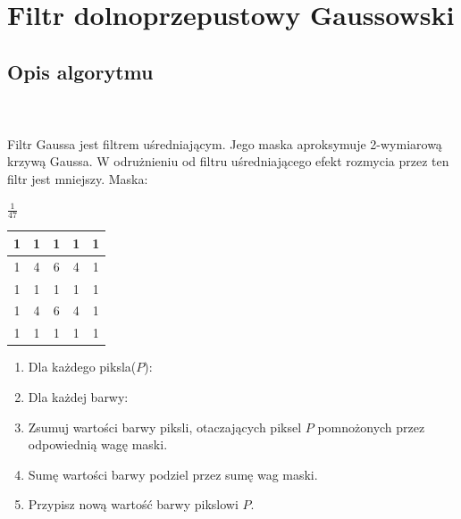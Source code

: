 \documentclass[final,a4paper,openany,12pt]{mwbk}
\begin{document}
\newpage



\section{Filtr dolnoprzepustowy Gaussowski}
\subsection*{Opis algorytmu}
\hfill
\\\\
\indent Filtr Gaussa jest filtrem uśredniającym. Jego maska aproksymuje 2-wymiarową krzywą Gaussa. W odrużnieniu od filtru uśredniającego efekt rozmycia przez ten filtr jest mniejszy. Maska:
\begin{center}
	$\frac{1}{47}$ 
	\begin{tabular}{|c|c|c|c|c|}
		\hline
		1 & 1 & 1 & 1 & 1\\
		\hline
		1 & 4 & 6 & 4 & 1\\
		\hline
		1 & 1 & 1 & 1 & 1\\
		\hline
		1 & 4 & 6 & 4 & 1\\
		\hline
		1 & 1 & 1 & 1 & 1\\
		\hline
	\end{tabular}
\end{center}

\begin{enumerate}
	\item Dla każdego piksla($P$):
	\item Dla każdej barwy:
	\item Zsumuj wartości barwy piksli, otaczających piksel $P$ pomnożonych przez odpowiednią wagę maski.
	\item Sumę wartości barwy podziel przez sumę wag maski.
	\item Przypisz nową wartość barwy pikslowi $P$.
\end{enumerate}
\end{document}
